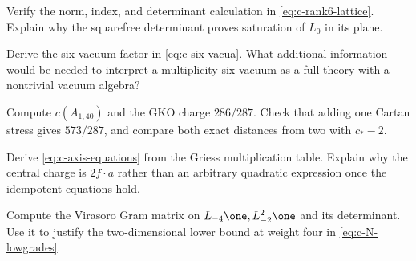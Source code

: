 \begin{exercise}\label{ex:c-coset-1}
Verify the norm, index, and determinant calculation in
\eqref{eq:c-rank6-lattice}. Explain why the squarefree determinant
proves saturation of $L_0$ in its plane.

\par\smallskip{}\par
\end{exercise}
\begin{exercise}\label{ex:c-coset-2}
Derive the six-vacuum factor in \eqref{eq:c-six-vacua}. What additional
information would be needed to interpret a multiplicity-six vacuum
as a full theory with a nontrivial vacuum algebra?

\par\smallskip{}\par
\end{exercise}
\begin{exercise}\label{ex:c-coset-3}
Compute $c(A_{1,40})$ and the GKO charge $286/287$. Check that adding
one Cartan stress gives $573/287$, and compare both exact distances
from two with $c_*-2$.

\par\smallskip{}\par
\end{exercise}
\begin{exercise}\label{ex:c-coset-4}
Derive \eqref{eq:c-axis-equations} from the Griess multiplication
table. Explain why the central charge is $2f\cdot a$ rather than
an arbitrary quadratic expression once the idempotent equations hold.

\par\smallskip{}\par
\end{exercise}
\begin{exercise}\label{ex:c-coset-5}
Compute the Virasoro Gram matrix on
$L_{-4}\one,L_{-2}^2\one$ and its determinant. Use it to justify
the two-dimensional lower bound at weight four in
\eqref{eq:c-N-lowgrades}.

\par\smallskip{}\par
\end{exercise}
